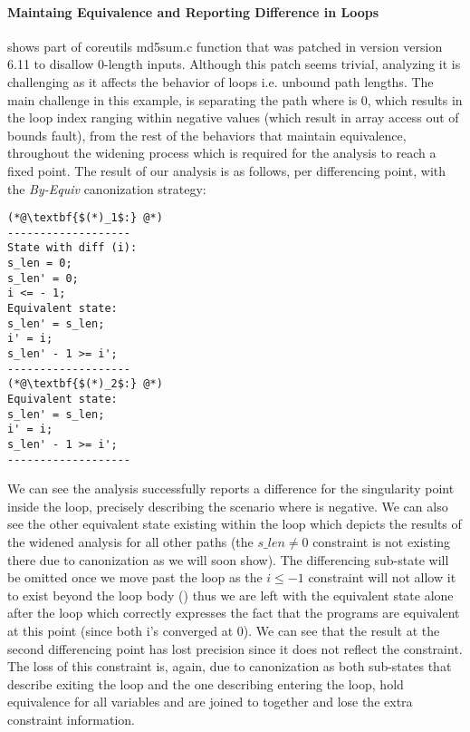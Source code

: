 \paragraph{Maintaing Equivalence and Reporting Difference in Loops}
 shows part of coreutils md5sum.c  function that was patched in version version 6.11 to disallow 0-length inputs. Although this patch seems trivial, analyzing it is challenging as it affects the behavior of loops i.e. unbound path lengths. The main challenge in this example, is separating the path where  is 0, which results in the loop index  ranging within negative values (which result in array access out of bounds fault), from the rest of the behaviors that maintain equivalence, throughout the widening process which is required for the analysis to reach a fixed point. The result of our analysis is as follows, per differencing point, with the \emph{By-Equiv} canonization strategy:
\begin{lstlisting}
(*@\textbf{$(*)_1$:} @*)
-------------------
State with diff (i):
s_len = 0; 
s_len' = 0;
i <= - 1;
Equivalent state:
s_len' = s_len;
i' = i;
s_len' - 1 >= i';
-------------------
(*@\textbf{$(*)_2$:} @*)
Equivalent state:
s_len' = s_len;
i' = i;
s_len' - 1 >= i';
-------------------
\end{lstlisting}
We can see the analysis successfully reports a difference for the singularity point  inside the loop, precisely describing the scenario where  is negative. We can also see the other equivalent state existing within the loop which depicts the results of the widened analysis for all other paths (the $s\_len \neq 0$ constraint is not existing there due to canonization as we will soon show). The differencing sub-state will be omitted once we move past the loop as the $i \leq -1$ constraint will not allow it to exist beyond the loop body () thus we are left with the equivalent state alone after the loop which correctly expresses the fact that the programs are equivalent at this point (since both i's converged at 0). We can see that the result at the second differencing point has lost precision since it does not reflect the  constraint. The loss of this constraint is, again, due to canonization as both sub-states that describe exiting the loop and the one describing entering the loop, hold equivalence for all variables and are joined to together and lose the extra constraint information.
